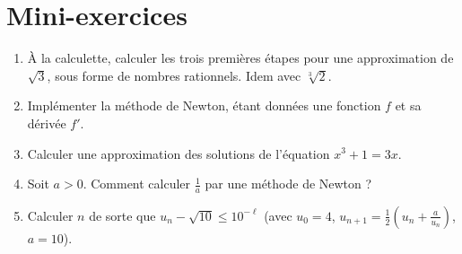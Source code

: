 \section{Mini-exercices}

\begin{frame}

\begin{miniexercice}
\begin{enumerate}
  \item \`A la calculette, calculer les trois premières étapes pour une approximation de 
  $\sqrt{3}$, sous forme de nombres rationnels.   Idem avec $\sqrt[3]{2}$. 
   
  \item Implémenter la méthode de Newton, étant données une fonction $f$ et sa dérivée $f'$.
  
  \item Calculer une approximation des solutions de l'équation $x^3+1=3x$.
  
  \item Soit $a>0$. Comment calculer $\frac{1}{a}$ par une méthode de Newton ?
  
  \item Calculer $n$ de sorte que $u_n-\sqrt{10} \le 10^{-\ell}$ (avec $u_0=4$, 
  $u_{n+1} =\frac{1}{2} \left(u_n+\frac{a}{u_n}\right)$, $a=10$).
  
\end{enumerate}
\end{miniexercice}

\end{frame}

